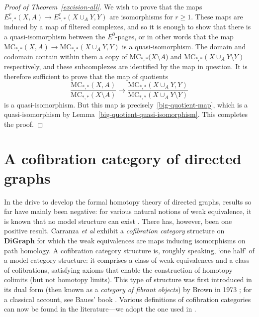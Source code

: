\documentclass[a4paper, 11 pt, oneside, reqno]{amsart}
\numberwithin{lemma}{section}
\theoremstyle{definition}
\newcommand{\cn}[1]{\mathbf{#1}}
\newcommand{\DiGraph}{\cn{DiGraph}}
\newcommand{\MC}{\mathrm{MC}}
\begin{document}
\begin{proof}[Proof of Theorem~\ref{excision-all}]
    We wish to prove that the maps 
    $E^r_{\ast,\ast}(X,A)\to E^r_{\ast,\ast}(X\cup_A Y,Y)$
    are isomorphisms for $r\geq 1$.
    These maps are induced by a map of filtered complexes,
    and so it is enough to show that there is a quasi-isomorphism
    between the $E^0$-pages,
    or in other words that the map
    $\MC_{\ast,\ast}(X,A)\to \MC_{\ast,\ast}(X\cup_A Y,Y)$
    is a quasi-isomorphism.
    The domain and codomain contain within them a
    copy of $\MC_{\ast,\ast}(X\setminus A$)
    and $\MC_{\ast,\ast}(X\cup_A Y \setminus Y)$
    respectively,
    and these subcomplexes are identified
    by the map in question.
    It is therefore sufficient to prove that the map
    of quotients
    \[
        \frac{\MC_{\ast,\ast}(X,A)}{\MC_{\ast,\ast}(X\setminus A)}
        \longrightarrow
        \frac{\MC_{\ast,\ast}(X\cup_A Y,Y)}
        {\MC_{\ast,\ast}(X\cup_A Y\setminus Y)}
    \] 
    is a quasi-isomorphism.
    But this map is precisely~\eqref{big-quotient-map},
    which is a quasi-isomorphism by
    Lemma~\ref{big-quotient-quasi-isomorphism}.
    This completes the proof.
\end{proof}
    

\section{A cofibration category of directed graphs}\label{sec:cofibration category}

In the drive to develop the formal homotopy theory of directed graphs, results so far have mainly been negative: for various natural notions of weak equivalence, it is known that no model structure can exist \cite{GoyalSanthanam2021, GoyalSanthanam2023, CarranzaKapulkinKim2023}. There has, however, been one positive result. Carranza \textit{et al} \cite{CDKOSW} exhibit a \emph{cofibration category} structure on \(\DiGraph\) for which the weak equivalences are maps inducing isomorphisms on path homology. A cofibration category structure is, roughly speaking, `one half' of a model category structure: it comprises a class of weak equivalences and a class of cofibrations, satisfying axioms that enable the construction of homotopy colimits (but not homotopy limits). This type of structure was first introduced in its dual form (then known as a \emph{category of fibrant objects}) by Brown in 1973 \cite{Brown1973}; for a classical account, see Baues' book \cite{Baues1989}. Various definitions of cofibration categories can now be found in the literature---we adopt the one used in \cite{CDKOSW}.
\end{document}
